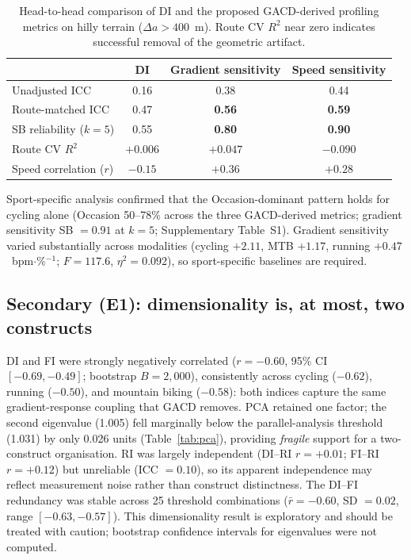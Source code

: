 \documentclass[12pt]{article}
\begin{document}
\begin{table}[t]
\centering
\caption{Head-to-head comparison of DI and the proposed GACD-derived
profiling metrics on hilly terrain ($\Delta a > 400$~m). Route CV $R^2$
near zero indicates successful removal of the geometric artifact.}
\label{tab:comparison}
\begin{tabular}{@{}lccc@{}}
\toprule
 & DI & Gradient sensitivity & Speed sensitivity \\
\midrule
Unadjusted ICC & 0.16 & 0.38 & 0.44 \\
Route-matched ICC & 0.47 & \textbf{0.56} & \textbf{0.59} \\
SB reliability ($k{=}5$) & 0.55 & \textbf{0.80} & \textbf{0.90} \\
Route CV $R^2$ & $+0.006$ & \textbf{$+0.047$} & $-0.090$ \\
Speed correlation ($r$) & $-0.15$ & \textbf{$+0.36$} & $+0.28$ \\
\bottomrule
\end{tabular}
\end{table}

Sport-specific analysis confirmed that the Occasion-dominant pattern holds
for cycling alone (Occasion 50--78\% across the three GACD-derived
metrics; gradient sensitivity SB $= 0.91$ at $k = 5$; Supplementary
Table~S1). Gradient sensitivity varied substantially across modalities
(cycling $+2.11$, MTB $+1.17$, running $+0.47$~bpm$\cdot$\%$^{-1}$;
$F = 117.6$, $\eta^2 = 0.092$), so sport-specific baselines are required.

\subsection{Secondary (E1): dimensionality is, at most, two constructs}
DI and FI were strongly negatively correlated ($r=-0.60$, 95\% CI
$[-0.69,-0.49]$; bootstrap $B=2{,}000$), consistently across cycling
($-0.62$), running ($-0.50$), and mountain biking ($-0.58$): both indices
capture the same gradient-response coupling that GACD removes. PCA
retained one factor; the second eigenvalue (1.005) fell marginally below
the parallel-analysis threshold (1.031) by only 0.026 units
(Table~\ref{tab:pca}), providing \emph{fragile} support for a
two-construct organisation. RI was largely independent (DI--RI $r=+0.01$;
FI--RI $r=+0.12$) but unreliable (ICC $= 0.10$), so its apparent
independence may reflect measurement noise rather than construct
distinctness. The DI--FI redundancy was stable across 25 threshold
combinations ($\bar r=-0.60$, SD $= 0.02$, range $[-0.63,-0.57]$). This
dimensionality result is exploratory and should be treated with caution;
bootstrap confidence intervals for eigenvalues were not computed.
\end{document}
